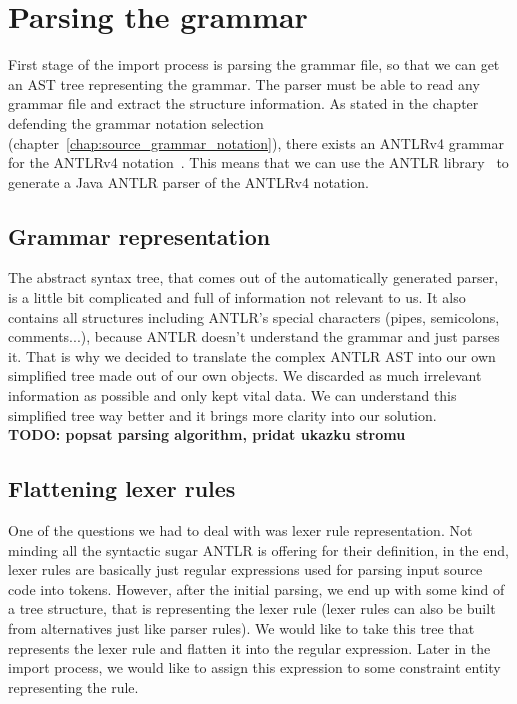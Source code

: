 \section{Parsing the grammar}

First stage of the import process is parsing the grammar file, so that we can get an AST tree representing the grammar.
The parser must be able to read any grammar file and extract the structure information.
As stated in the chapter defending the grammar notation selection (chapter~\ref{chap:source_grammar_notation}), there exists an ANTLRv4 grammar for the ANTLRv4 notation~\cite{ANTLR4reference}.
This means that we can use the ANTLR library~\cite{ANTLR4} to generate a Java ANTLR parser of the ANTLRv4 notation.

\subsection{Grammar representation}

The abstract syntax tree, that comes out of the automatically generated parser, is a little bit complicated and full of information not relevant to us.
It also contains all structures including ANTLR's special characters (pipes, semicolons, comments...), because ANTLR doesn't understand the grammar and just parses it.
That is why we decided to translate the complex ANTLR AST into our own simplified tree made out of our own objects.
We discarded as much irrelevant information as possible and only kept vital data.
We can understand this simplified tree way better and it brings more clarity into our solution.
\\

\textbf{TODO: popsat parsing algorithm, pridat ukazku stromu}

\subsection{Flattening lexer rules}
One of the questions we had to deal with was lexer rule representation.
Not minding all the syntactic sugar ANTLR is offering for their definition, in the end, lexer rules are basically just regular expressions used for parsing input source code into tokens.
However, after the initial parsing, we end up with some kind of a tree structure, that is representing the lexer rule (lexer rules can also be built from alternatives just like parser rules).
We would like to take this tree that represents the lexer rule and flatten it into the regular expression.
Later in the import process, we would like to assign this expression to some constraint entity representing the rule.

